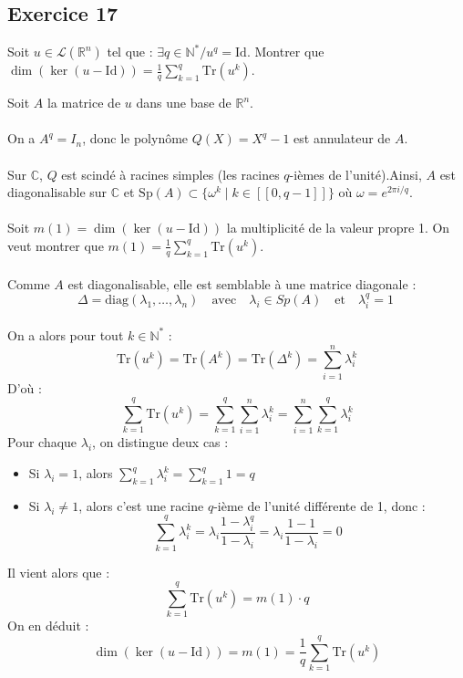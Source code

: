 \documentclass[a4paper,12pt]{article}
\begin{document}
    \subsection*{Exercice 17}
    Soit \( u \in \mathcal{L}(\mathbb{R}^n) \) tel que : \( \exists q \in \mathbb{N}^* / u^q = \mathrm{Id} \). 
    Montrer que \( \dim (\ker (u - \mathrm{Id})) = \frac{1}{q} \sum_{k=1}^{q} \mathrm{Tr}(u^k) \).
    
    \begin{correctionbox}
        Soit \( A \) la matrice de \( u \) dans une base de \( \mathbb{R}^n \). \\ \\
        On a \( A^q = I_n \), donc le polynôme \( Q(X) = X^q - 1 \) est annulateur de \( A \). \\ \\
        Sur \( \mathbb{C} \), \( Q \) est scindé à racines simples (les racines \( q \)-ièmes de l'unité).Ainsi, \( A \) est diagonalisable sur \( \mathbb{C} \) et \( \mathrm{Sp}(A) \subset \{ \omega^k \mid k \in [\![ 0, q-1 ]\!]\} \) où \( \omega = e^{2\pi i/q} \). \\ \\
        Soit \( m(1) = \dim(\ker(u - \mathrm{Id})) \) la multiplicité de la valeur propre 1. On veut montrer que \( m(1) = \frac{1}{q} \sum_{k=1}^{q} \mathrm{Tr}(u^k) \). \\ \\
        Comme \( A \) est diagonalisable, elle est semblable à une matrice diagonale :
        \[
        \Delta = \mathrm{diag}(\lambda_1, \dots, \lambda_n) \quad \text{avec} \quad \lambda_i \in Sp(A)\quad \text{et} \quad \lambda_i^q = 1 \    
        \] \\
        On a alors pour tout \( k \in \mathbb{N}^* \) :
        \[
        \mathrm{Tr}(u^k) = \mathrm{Tr}(A^k) = \mathrm{Tr}(\Delta^k) = \sum_{i=1}^n \lambda_i^k
        \]
        D'où :
        \[
        \sum_{k=1}^{q} \mathrm{Tr}(u^k) = \sum_{k=1}^{q} \sum_{i=1}^n \lambda_i^k 
        = \sum_{i=1}^n \sum_{k=1}^{q} \lambda_i^k
        \]
        Pour chaque \( \lambda_i \), on distingue deux cas :
        \begin{itemize}
        \item Si \( \lambda_i = 1 \), alors \( \sum_{k=1}^{q} \lambda_i^k = \sum_{k=1}^{q} 1 = q \)
        \item Si \( \lambda_i \neq 1 \), alors c'est une racine \( q \)-ième de l'unité différente de 1, donc :
        \[
        \sum_{k=1}^{q} \lambda_i^k = \lambda_i \frac{1 - \lambda_i^q}{1 - \lambda_i} = \lambda_i \frac{1 - 1}{1 - \lambda_i} = 0
        \]
        \end{itemize}
        Il vient alors que :
        \[
        \sum_{k=1}^{q} \mathrm{Tr}(u^k) = m(1) \cdot q
        \]
        On en déduit :
        \[
        \dim(\ker(u - \mathrm{Id})) = m(1) = \frac{1}{q} \sum_{k=1}^{q} \mathrm{Tr}(u^k)
        \]
    \end{correctionbox}
\end{document}
